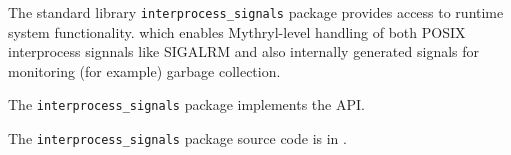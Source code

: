 
The standard library {\tt interprocess\_signals} package provides access to runtime system functionality. 
which enables Mythryl-level handling of both POSIX interprocess signnals like SIGALRM and also 
internally generated signals for monitoring (for example) garbage collection. 

The {\tt interprocess\_signals} package implements the  API.

The {\tt interprocess\_signals} package source code is in .




